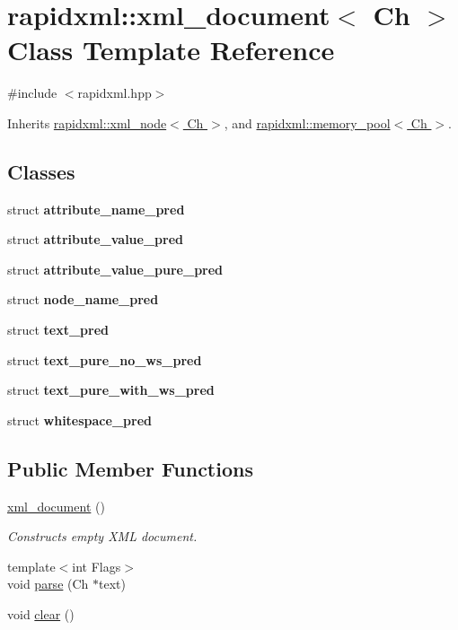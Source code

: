 \hypertarget{classrapidxml_1_1xml__document}{\section{rapidxml\-:\-:xml\-\_\-document$<$ Ch $>$ Class Template Reference}
\label{classrapidxml_1_1xml__document}
}


{\ttfamily \#include $<$rapidxml.\-hpp$>$}



Inherits \hyperlink{classrapidxml_1_1xml__node}{rapidxml\-::xml\-\_\-node$<$ Ch $>$}, and \hyperlink{classrapidxml_1_1memory__pool}{rapidxml\-::memory\-\_\-pool$<$ Ch $>$}.

\subsection*{Classes}
\begin{DoxyCompactItemize}
\item 
struct {\bfseries attribute\-\_\-name\-\_\-pred}
\item 
struct {\bfseries attribute\-\_\-value\-\_\-pred}
\item 
struct {\bfseries attribute\-\_\-value\-\_\-pure\-\_\-pred}
\item 
struct {\bfseries node\-\_\-name\-\_\-pred}
\item 
struct {\bfseries text\-\_\-pred}
\item 
struct {\bfseries text\-\_\-pure\-\_\-no\-\_\-ws\-\_\-pred}
\item 
struct {\bfseries text\-\_\-pure\-\_\-with\-\_\-ws\-\_\-pred}
\item 
struct {\bfseries whitespace\-\_\-pred}
\end{DoxyCompactItemize}
\subsection*{Public Member Functions}
\begin{DoxyCompactItemize}
\item 
\hypertarget{classrapidxml_1_1xml__document_aae8841b15085ba8f32ff46587ace28f5}{\hyperlink{classrapidxml_1_1xml__document_aae8841b15085ba8f32ff46587ace28f5}{xml\-\_\-document} ()}\label{classrapidxml_1_1xml__document_aae8841b15085ba8f32ff46587ace28f5}

\begin{DoxyCompactList}\small\item\em Constructs empty X\-M\-L document. \end{DoxyCompactList}\item 
{\footnotesize template$<$int Flags$>$ }\\void \hyperlink{classrapidxml_1_1xml__document_ac6e73ff9ac323bf5a370c38feb03a6b1}{parse} (Ch $\ast$text)
\item 
void \hyperlink{classrapidxml_1_1xml__document_a826929ff54242532198701f19ff5f83f}{clear} ()
\end{DoxyCompactItemize}
